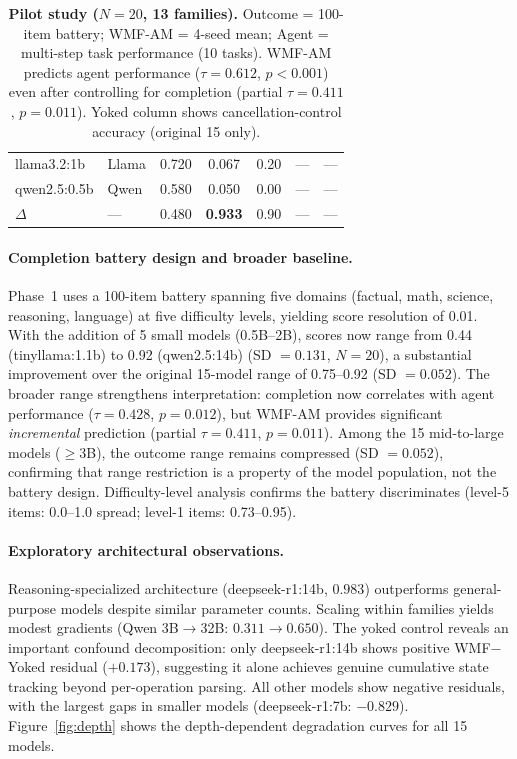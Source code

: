 \documentclass{article}
\begin{document}
\begin{table}[t]
{\begin{tabular}{llccccc}
llama3.2:1b     & Llama    & 0.720 & 0.067 & 0.20 & --- & --- \\
qwen2.5:0.5b    & Qwen     & 0.580 & 0.050 & 0.00 & --- & --- \\
\midrule
$\Delta$ & — & 0.480 & \textbf{0.933} & 0.90 & — & — \\
\bottomrule
\end{tabular}}
\caption{\textbf{Pilot study ($N{=}20$, 13 families).}
Outcome = 100-item battery; WMF-AM = 4-seed mean; Agent = multi-step
task performance (10 tasks). WMF-AM predicts agent performance
($\tau = 0.612$, $p < 0.001$) even after controlling for completion
(partial $\tau = 0.411$, $p = 0.011$). Yoked column shows
cancellation-control accuracy (original 15 only).}
\label{tab:pilot}
\end{table}

\paragraph{Completion battery design and broader baseline.}
Phase~1 uses a 100-item battery spanning five domains (factual, math,
science, reasoning, language) at five difficulty levels, yielding score
resolution of 0.01. With the addition of 5 small models (0.5B--2B),
scores now range from 0.44 (tinyllama:1.1b) to 0.92 (qwen2.5:14b)
(SD $= 0.131$, $N{=}20$), a substantial improvement over the original
15-model range of 0.75--0.92 (SD $= 0.052$). The broader range
strengthens interpretation: completion now correlates with agent performance
($\tau = 0.428$, $p = 0.012$), but WMF-AM provides significant
\emph{incremental} prediction (partial $\tau = 0.411$, $p = 0.011$).
Among the 15 mid-to-large models ($\geq$3B), the outcome range remains
compressed (SD $= 0.052$), confirming that range restriction is a
property of the model population, not the battery design. Difficulty-level
analysis confirms the battery discriminates
(level-5 items: 0.0--1.0 spread; level-1 items: 0.73--0.95).

\paragraph{Exploratory architectural observations.}
Reasoning-specialized architecture (deepseek-r1:14b, $0.983$)
outperforms general-purpose models despite similar parameter counts.
Scaling within families yields modest gradients (Qwen 3B$\to$32B:
$0.311 \to 0.650$). The yoked control reveals an important confound
decomposition: only deepseek-r1:14b shows positive WMF$-$Yoked
residual ($+0.173$), suggesting it alone achieves genuine cumulative
state tracking beyond per-operation parsing. All other models show
negative residuals, with the largest gaps in smaller models
(deepseek-r1:7b: $-0.829$).
Figure~\ref{fig:depth} shows the depth-dependent
degradation curves for all 15 models.
\end{document}
